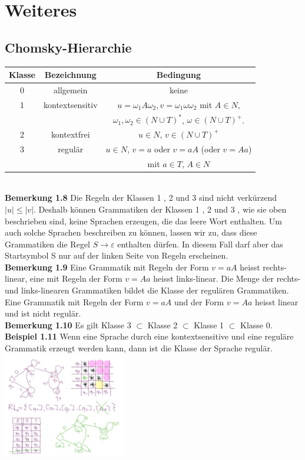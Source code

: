 \documentclass[a4paper,10pt,landscape,twocolumn]{article}
\newcommand{\Bold}[1]{\textbf{#1}} %
\begin{document}
\section{Weiteres}
\subsection{Chomsky-Hierarchie}
\begin{tabular}{|c|c|c|}\hline
 Klasse&Bezeichnung&Bedingung\\\hline\hline
 0&allgemein&keine\\\hline
 1&kontextsensitiv&$u=\omega_1A\omega_2,v=\omega_1\omega\omega_2$ mit $A\in N$,\\
 &&$\omega_1,\omega_2\in(N\cup T)^*$, $\omega\in(N\cup T)^+$.\\\hline
 2&kontextfrei&$u\in N$, $v\in(N\cup T)^+$\\\hline
 3&regul\"ar&$u\in N$, $v=a$ oder $v=aA$ (oder $v=Aa$)\\
 &&mit $a\in T$, $A\in N$\\\hline
\end{tabular}\\
\Bold{Bemerkung 1.8} Die Regeln der Klassen 1 , 2 und 3 sind nicht verkürzend $|u|\leq |v|$. Deshalb können Grammatiken der Klassen 1 , 2 und 3 , wie sie oben beschrieben sind, keine Sprachen erzeugen, die das leere Wort enthalten. Um auch solche Sprachen beschreiben zu können, lassen wir zu, dass diese Grammatiken die Regel $S\to\varepsilon$ enthalten dürfen. In diesem Fall darf aber das Startsymbol S nur auf der linken Seite von Regeln erscheinen.\\
\Bold{Bemerkung 1.9} Eine Grammatik mit Regeln der Form $v = aA$ heisst rechts-linear, eine mit Regeln der Form $v = Aa$ heisst links-linear. Die Menge der rechts- und links-linearen Grammatiken bildet die Klasse der regulären Grammatiken. Eine Grammatik mit Regeln der Form $v = aA$ und der Form $v = Aa$ heisst linear und ist nicht regulär.\\
\Bold{Bemerkung 1.10} Es gilt Klasse 3 $\subset$ Klasse 2 $\subset$ Klasse 1 $\subset$ Klasse 0.\\
\Bold{Beispiel 1.11} Wenn eine Sprache durch eine kontextsensitive und eine reguläre Grammatik erzeugt werden kann, dann ist die Klasse der Sprache regulär.\\
\includegraphics[width=0.4\textwidth,keepaspectratio]{Bild2Zufa.pdf}\\
\end{document}
